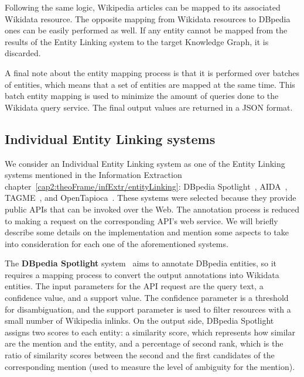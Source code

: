 Following the same logic, Wikipedia articles can be mapped to its associated Wikidata resource. 
The opposite mapping from Wikidata resources to DBpedia ones can be easily performed as well. 
If any entity cannot be mapped from the results of the Entity Linking system to the target 
Knowledge Graph, it is discarded.

A final note about the entity mapping process is that it is performed over batches of entities, 
which means that a set of entities are mapped at the same time. This batch entity mapping is 
used to minimize the amount of queries done to the Wikidata query service. The final output 
values are returned in a JSON format.

\subsection{Individual Entity Linking systems}
\label{cap3:system/entLinModule/individualSystems}
We consider an Individual Entity Linking system as one of the Entity Linking systems mentioned 
in the Information Extraction chapter~\ref{cap2:theoFrame/infExtr/entityLinking}: 
DBpedia Spotlight~\cite{EL:dbpedia-spotlight-MendesJGB11}, 
AIDA~\cite{EL:aida-tool-YosefHBSW11, EL:aida-HoffartYBFPSTTW11}, TAGME~\cite{EL:tagme-FerraginaS10}, 
and OpenTapioca~\cite{EL:opentapioca-Delpeuch19}. These systems were selected because they 
provide public APIs that can be invoked over the Web. The annotation process is reduced to 
making a request on the corresponding API’s web service. We will briefly describe some details 
on the implementation and mention some aspects to take into consideration for each one of the 
aforementioned systems.

The \textbf{DBpedia Spotlight} system~\cite{EL:dbpedia-spotlight-MendesJGB11} aims to 
annotate DBpedia entities, so it requires a mapping process to convert the output annotations 
into Wikidata entities. The input parameters for the API request are the query text, a 
confidence value, and a support value. The confidence parameter is a threshold for disambiguation, 
and the support parameter is used to filter resources with a small number of Wikipedia 
inlinks. On the output side, DBpedia Spotlight assigns two scores to each entity: a 
similarity score, which represents how similar are the mention and the entity, and a 
percentage of second rank, which is the ratio of similarity scores between the second and the 
first candidates of the corresponding mention (used to measure the level of ambiguity for the 
mention).

